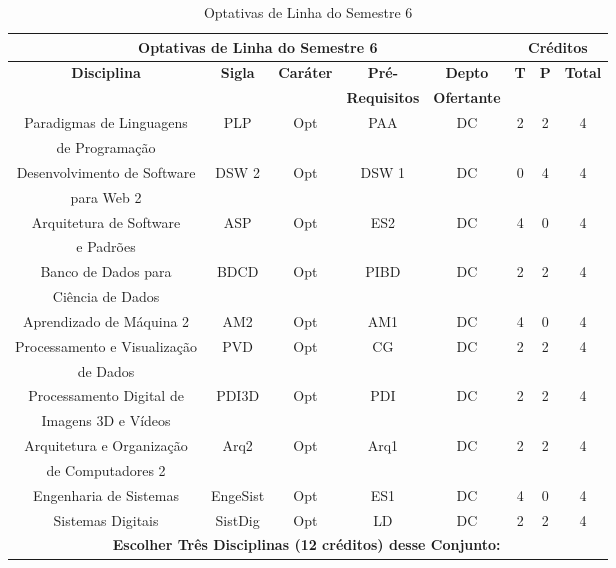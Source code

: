 \begin{table}[H]
\caption{Optativas de Linha do Semestre 6}
\centering
\footnotesize
\begin{tabular}{|c|c|c|c|c|c|c|c|} %
\hline
\hline
\multicolumn{5}{|c|}{\textbf{Optativas de Linha do Semestre 6}}  &  \multicolumn{3}{|c|}{\textbf{Créditos}} \\
\hline
\hline
\textbf{Disciplina} & \textbf{Sigla} & \textbf{Caráter} & \textbf{Pré-} & \textbf{Depto} &  \textbf{T}  &  \textbf{P}  & \textbf{Total} \\ 
& & & \textbf{Requisitos}  & \textbf{Ofertante} & & & \\
\hline 
Paradigmas de Linguagens & PLP & Opt & PAA & DC & 2 & 2 & 4 \\
de Programação & & & & & & & \\
\hline
Desenvolvimento de Software & DSW 2 & Opt & DSW 1 & DC & 0 & 4 & 4 \\
para Web 2 & & & & & & & \\
\hline
Arquitetura de Software & ASP & Opt & ES2 & DC & 4 & 0 & 4 \\
e Padrões & & & & & & &  \\
\hline
Banco de Dados para & BDCD & Opt & PIBD & DC & 2 & 2 & 4 \\
Ciência de Dados & & & & & & & \\
\hline
Aprendizado de Máquina 2 & AM2 & Opt & AM1 & DC & 4 & 0 & 4 \\
\hline
Processamento e Visualização & PVD & Opt & CG & DC & 2 & 2 & 4 \\
de Dados & & & & & & & \\
\hline
Processamento Digital de & PDI3D & Opt & PDI & DC & 2 & 2 & 4 \\
Imagens 3D e Vídeos & & & & & & & \\  
\hline
Arquitetura e Organização & Arq2 & Opt & Arq1 & DC & 2 & 2 & 4 \\
de Computadores 2 & & & & & & & \\
\hline
Engenharia de Sistemas & EngeSist & Opt & ES1 & DC & 4 & 0 & 4 \\
\hline
Sistemas Digitais & SistDig & Opt & LD & DC & 2 & 2 & 4 \\
\hline
\hline
\multicolumn{5}{|r|}{\textbf{Escolher Três Disciplinas (12 créditos) desse Conjunto: }} &    &     &  \\ %
\hline
\hline
\end{tabular}
\label{tab:OptTrilha-Semestre6}
\end{table}






